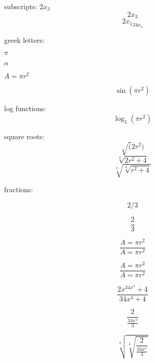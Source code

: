 \documentclass[10]{article}
\begin{document}
subscripts: $2x_3$
$$2x_3$$
$${2x_1}_{34x_4}$$

greek letters:

$\pi$

$\alpha$

$A=\pi r^2$

$$\sin(\pi r^2)$$

log functions:
$$\log_5(\pi r^2)$$

square roots:
$$\sqrt(2 r^2)$$
$$\sqrt[3]{2 r^2+4}$$
$$\sqrt[3]{\sqrt[4]{r^2+4}}$$

fractions:

$$2/3$$

$$\frac{2}{3}$$

$$\frac{A=\pi r^2}{A=\pi r^2}$$

$$\displaystyle{\frac{A=\pi r^2}{A=\pi r^2}}$$

$$\frac{2x^{34x^4}+4}{34x^4+4}$$

$$\frac{2}{\frac{34x^4}{3}}$$

$$\sqrt[3]{\sqrt[4]{\frac{2}{\frac{34x^4}{3}}}}$$ \fi
\end{document}

